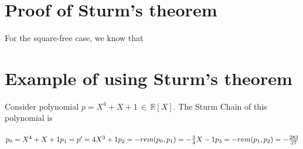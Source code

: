 \documentclass[a4paper]{article}
\begin{document}
\pagebreak

\section{Proof of Sturm's theorem}

For the square-free case, we know that

\section{Example of using Sturm's theorem}

Consider polynomial $p = X^4 + X + 1 \, \in \, \mathbb{R}[X]$. The Sturm Chain of this polynomial is \\~
\begin{math}
  p_0 = X^4 + X + 1 \\
  p_1 = p^{\prime} =  4X^3 + 1 \\
  p_2 = -rem(p_0, p_1)  = -\frac{3}{4}X - 1\\
  p_3 = -rem(p_1, p_2) = -\frac{283}{27}\\
\end{math}
\end{document}
